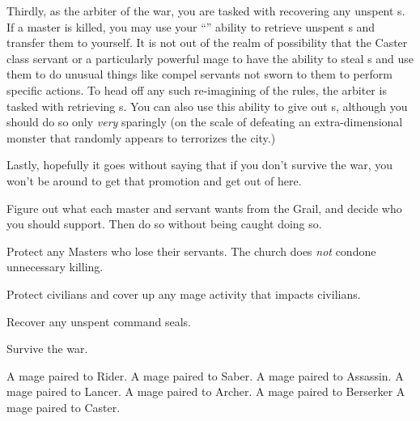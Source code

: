 \documentclass[char]{FateDarkDawn}
\begin{document}
Thirdly, as the arbiter of the war, you are tasked with recovering any unspent \iCommand{\MYname}s. If a master is killed, you may use your ``\aRetrieveCommand{}'' ability to retrieve unspent \iCommand{\MYname}s and transfer them to yourself. It is not out of the realm of possibility that the Caster class servant or a particularly powerful mage to have the ability to steal \iCommand{\MYname}s and use them to do unusual things like compel servants not sworn to them to perform specific actions. To head off any such re-imagining of the rules, the arbiter is tasked with retrieving \iCommand{\MYname}s. You can also use this ability to give out \iCommand{\MYname}s, although you should do so only \emph{very} sparingly (on the scale of defeating an extra-dimensional monster that randomly appears to terrorizes the city.)

Lastly, hopefully it goes without saying that if you don't survive the war, you won't be around to get that promotion and get out of here.

\begin{itemz}[Goals]
	\item Figure out what each master and servant wants from the Grail, and decide who you should support. Then do so without being caught doing so.
	\item Protect any Masters who lose their servants. The church does \emph{not} condone unnecessary killing.
	\item Protect civilians and cover up any mage activity that impacts civilians.
	\item Recover any unspent command seals.
	\item Survive the war.
\end{itemz}

\begin{itemz}[Notes]
	\item 
\end{itemz}

\begin{contacts}
	\contact{\cBarth{}} A mage paired to Rider.
	\contact{\cEizen{}} A mage paired to Saber.
	\contact{\cMatou{}} A mage paired to Assassin.
	\contact{\cFaolan{}} A mage paired to Lancer.
	\contact{\cSophia{}} A mage paired to Archer.
	\contact{\cTohsaka{}} A mage paired to Berserker
	\contact{\cVelvet{}} A mage paired to Caster.
\end{contacts}
\end{document}
